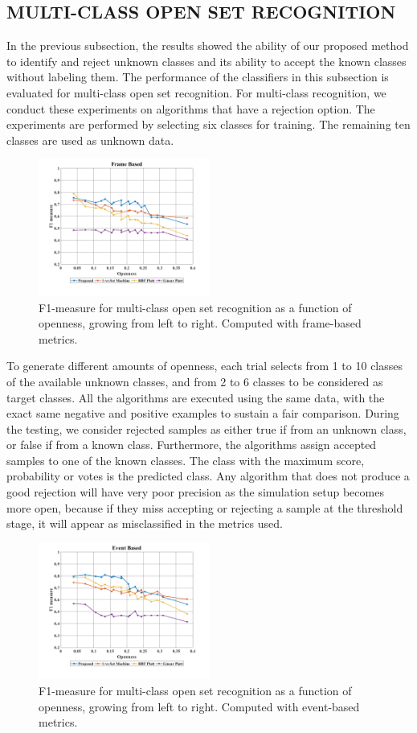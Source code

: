 \documentclass{ieeeaccess}
\begin{document}
\subsection{MULTI-CLASS OPEN SET RECOGNITION}
In the previous subsection, the results showed the ability of our proposed method to identify and reject unknown classes and its ability to accept the known classes without labeling them. The performance of the classifiers in this subsection is evaluated for multi-class open set recognition. For multi-class recognition, we conduct these experiments on algorithms that have a rejection option. The experiments are performed by selecting six classes for training. The remaining ten classes are used as unknown data. 
\begin{figure}[t!]
	\centering
	\includegraphics[width=0.5\textwidth]{img/multi_frame.png}
	\caption{F1-measure for multi-class open set recognition as a function of openness, growing from left to right. Computed with frame-based metrics.}
	\label{fig:fig10}
\end{figure}
To generate different amounts of openness, each trial selects from 1 to 10 classes of the available unknown classes, and from 2 to 6 classes to be considered as target classes. All the algorithms are executed using the same data, with the exact same negative and positive examples to sustain a fair comparison. During the testing, we consider rejected samples as either true if from an unknown class, or false if from a known class. Furthermore, the algorithms assign accepted samples to one of the known classes. The class with the maximum score, probability or votes is the predicted class. Any algorithm that does not produce a good rejection will have very poor precision as the simulation setup becomes more open, because if they miss accepting or rejecting a sample at the threshold stage, it will appear as misclassified in the metrics used.\\
\begin{figure}[t!]
	\centering
	\includegraphics[width=0.5\textwidth]{img/multi_event.png}
	\caption{F1-measure for multi-class open set recognition as a function of openness, growing from left to right. Computed with event-based metrics.}
	\label{fig:fig11}
\end{figure}
\end{document}
